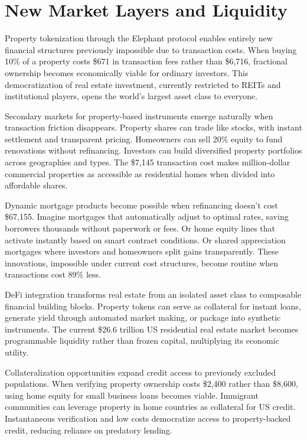 \section{New Market Layers and Liquidity}

Property tokenization through the Elephant protocol enables entirely new financial structures previously impossible due to transaction costs. When buying 10\% of a property costs \$671 in transaction fees rather than \$6,716, fractional ownership becomes economically viable for ordinary investors. This democratization of real estate investment, currently restricted to REITs and institutional players, opens the world's largest asset class to everyone.

Secondary markets for property-based instruments emerge naturally when transaction friction disappears. Property shares can trade like stocks, with instant settlement and transparent pricing. Homeowners can sell 20\% equity to fund renovations without refinancing. Investors can build diversified property portfolios across geographies and types. The \$7,145 transaction cost makes million-dollar commercial properties as accessible as residential homes when divided into affordable shares.

Dynamic mortgage products become possible when refinancing doesn't cost \$67,155. Imagine mortgages that automatically adjust to optimal rates, saving borrowers thousands without paperwork or fees. Or home equity lines that activate instantly based on smart contract conditions. Or shared appreciation mortgages where investors and homeowners split gains transparently. These innovations, impossible under current cost structures, become routine when transactions cost 89\% less.

DeFi integration transforms real estate from an isolated asset class to composable financial building blocks. Property tokens can serve as collateral for instant loans, generate yield through automated market making, or package into synthetic instruments. The current \$26.6 trillion US residential real estate market becomes programmable liquidity rather than frozen capital, multiplying its economic utility.

Collateralization opportunities expand credit access to previously excluded populations. When verifying property ownership costs \$2,400 rather than \$8,600, using home equity for small business loans becomes viable. Immigrant communities can leverage property in home countries as collateral for US credit. Instantaneous verification and low costs democratize access to property-backed credit, reducing reliance on predatory lending.

